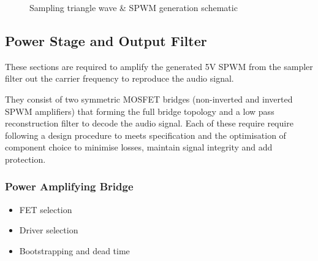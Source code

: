\documentclass[11pt]{article}
\begin{document}
{\begin{figure}[h!]
  \centering
  \caption{Sampling triangle wave \& SPWM generation schematic}
  \label{F:sample_schem}
\end{figure}

\subsection{Power Stage and Output Filter}

These sections are required to amplify the generated 5V SPWM from the sampler filter out the carrier frequency to reproduce the audio signal. 

They consist of two symmetric MOSFET bridges (non-inverted and inverted SPWM amplifiers) that forming the full bridge topology and a low pass reconstruction filter to decode the audio signal.
Each of these require require following a design procedure to meets specification and the optimisation of component choice to minimise losses, maintain signal integrity and add protection.

\subsubsection*{Power Amplifying Bridge}



\begin{itemize}
  \item FET selection
  \item Driver selection
  \item Bootstrapping and dead time
\end{itemize}

}
\end{document}

